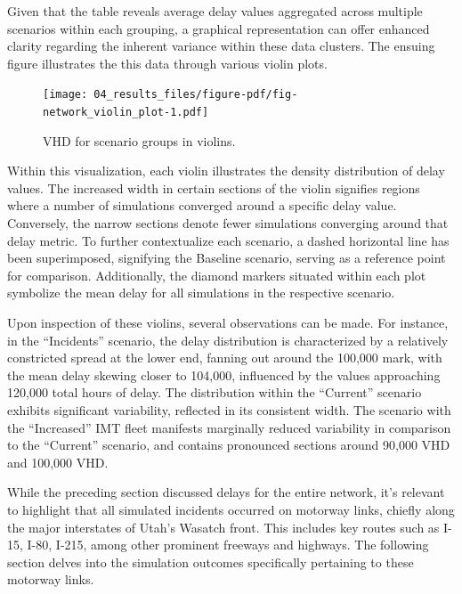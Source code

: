 \documentclass[
  letterpaper,
  authoryear]{elsarticle}
\begin{document}
Given that the table reveals average delay values aggregated across
multiple scenarios within each grouping, a graphical representation can
offer enhanced clarity regarding the inherent variance within these data
clusters. The ensuing figure illustrates the this data through various
violin plots.

\begin{figure}

{\centering \texttt{[image: 04\_results\_files/figure-pdf/fig-network\_violin\_plot-1.pdf]}

}

\caption{\label{fig-network_violin_plot}VHD for scenario groups in
violins.}

\end{figure}

Within this visualization, each violin illustrates the density
distribution of delay values. The increased width in certain sections of
the violin signifies regions where a number of simulations converged
around a specific delay value. Conversely, the narrow sections denote
fewer simulations converging around that delay metric. To further
contextualize each scenario, a dashed horizontal line has been
superimposed, signifying the Baseline scenario, serving as a reference
point for comparison. Additionally, the diamond markers situated within
each plot symbolize the mean delay for all simulations in the respective
scenario.

Upon inspection of these violins, several observations can be made. For
instance, in the ``Incidents'' scenario, the delay distribution is
characterized by a relatively constricted spread at the lower end,
fanning out around the 100,000 mark, with the mean delay skewing closer
to 104,000, influenced by the values approaching 120,000 total hours of
delay. The distribution within the ``Current'' scenario exhibits
significant variability, reflected in its consistent width. The scenario
with the ``Increased'' IMT fleet manifests marginally reduced
variability in comparison to the ``Current'' scenario, and contains
pronounced sections around 90,000 VHD and 100,000 VHD.

While the preceding section discussed delays for the entire network,
it's relevant to highlight that all simulated incidents occurred on
motorway links, chiefly along the major interstates of Utah's Wasatch
front. This includes key routes such as I-15, I-80, I-215, among other
prominent freeways and highways. The following section delves into the
simulation outcomes specifically pertaining to these motorway links.
\end{document}
